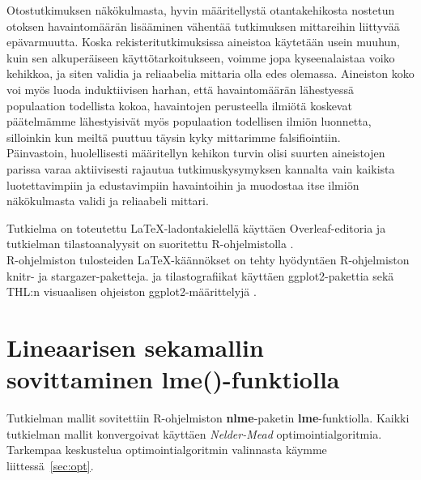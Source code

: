 \documentclass[finnish]{docopts}
\begin{document}
Otostutkimuksen näkökulmasta, hyvin määritellystä otantakehikosta nostetun otoksen havaintomäärän lisääminen vähentää tutkimuksen mittareihin liittyvää epävarmuutta. Koska rekisteritutkimuksissa aineistoa käytetään usein muuhun, kuin sen alkuperäiseen käyttötarkoitukseen, voimme jopa kyseenalaistaa voiko kehikkoa, ja siten validia ja reliaabelia mittaria olla edes olemassa. Aineiston koko voi myös luoda induktiivisen harhan, että havaintomäärän lähestyessä populaation todellista kokoa, havaintojen perusteella ilmiötä koskevat päätelmämme lähestyisivät myös populaation todellisen ilmiön luonnetta, silloinkin kun meiltä puuttuu täysin kyky mittarimme falsifiointiin.\\

Päinvastoin, huolellisesti määritellyn kehikon turvin olisi suurten aineistojen parissa varaa aktiivisesti rajautua tutkimuskysymyksen kannalta vain kaikista luotettavimpiin ja edustavimpiin havaintoihin ja muodostaa itse ilmiön näkökulmasta validi ja reliaabeli mittari.\\

\newpage

\nocite{*}




\lastpage

\appendices

\pagestyle{empty}

\label{appx:tools}

Tutkielma on toteutettu \LaTeX-ladontakielellä käyttäen Overleaf-editoria \citep{overleaf} ja tutkielman tilastoanalyysit on suoritettu R-ohjelmistolla \citep{rsoftware}.\\

R-ohjelmiston tulosteiden \LaTeX-käännökset on tehty hyödyntäen R-ohjelmiston knitr- ja stargazer-paketteja. \citep{knitr, stargazer} ja tilastografiikat käyttäen ggplot2-pakettia \citep{ggplot} sekä THL:n visuaalisen ohjeiston ggplot2-määrittelyjä \citep{thlgraphs}.

\section{Lineaarisen sekamallin sovittaminen lme()-funktiolla}
\label{sec:lme}

Tutkielman mallit sovitettiin R-ohjelmiston \citep{rsoftware} \textbf{nlme}-paketin \textbf{lme}-funktiolla. Kaikki tutkielman mallit konvergoivat käyttäen \textit{Nelder-Mead} optimointialgoritmia. Tarkempaa keskustelua optimointialgoritmin valinnasta käymme liittessä~\ref{sec:opt}.\\
\end{document}
